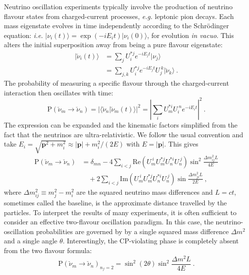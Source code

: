 Neutrino oscillation experiments typically involve the production of neutrino
flavour states from charged-current processes, \textit{e.g.} leptonic pion
decays. Each mass eigenstate evolves in time independently according to the
Schr\"{o}dinger equation: \textit{i.e.}
$| \nu_{i} (t) \rangle = \exp{(-i E_{i} t)} | \nu_{i} (0) \rangle$, for evolution
\textit{in vacuo}. This alters the initial superposition away from being a pure
flavour eigenstate:
\begin{align}
  | \breve{\nu}_{i} (t) \rangle &= \sum_{j} U_{i}^{* j} e^{-i E_{j} t} | \nu_{j} \rangle \\
                                &= \sum_{j,k} U_{i}^{* j} e^{-i E_{j} t} U_{j}^{\ k} | \breve{\nu}_{k} \rangle \ .
\end{align}
The probability of measuring a specific flavour through the charged-current
interaction then oscillates with time:
\begin{equation}
  \text{P}(\breve{\nu}_{m} \to \breve{\nu}_{n}) = | \langle \breve{\nu}_{n} | \breve{\nu}_{m} (t) \rangle |^{2} = \left| \sum_{i} U_{m}^{* i} U_{i}^{\ n} e^{-i E_{i} t} \right|^{2} \ .
\end{equation}
The expression can be expanded and the kinematic factors simplified from the
fact that the neutrinos are ultra-relativistic. We follow the usual convention
and take
$E_{i} = \sqrt{\mathbf{p}^{2} + m_{i}^{2}} \approx |\mathbf{p}| + m_{i}^{2} / (2 E)$
with $E = |\mathbf{p}|$. This gives
\begin{equation}
  \label{eq:neutrino-osc}
  \begin{aligned}
    \text{P}(\breve{\nu}_{m} \to \breve{\nu}_{n}) &= \delta_{mn} - 4 \sum_{i < j} \mathrm{Re}\left( U_{m}^{\ i} U_{m}^{* j} U_{n}^{* i} U_{n}^{\ j}  \right) \sin^{2} \frac{\Delta m_{ij}^{2} L}{4E}\\
    &\quad + 2 \sum_{i<j} \mathrm{Im}\left( U_{m}^{\ i} U_{m}^{* j} U_{n}^{* i} U_{n}^{\ j}  \right) \sin \frac{\Delta m^{2}_{ji} L}{2E} \ ,
  \end{aligned}
\end{equation}
where $\Delta m_{ij}^{2} \equiv m_{j}^{2} - m_{i}^{2}$ are the squared neutrino
mass differences and $L = ct$, sometimes called the baseline, is the approximate
distance travelled by the particles. To interpret the results of many
experiments, it is often sufficient to consider an effective two-flavour
oscillation paradigm. In this case, the neutrino-oscillation probabilities are
governed by by a single squared mass difference $\Delta m^{2}$ and a single
angle $\theta$. Interestingly, the CP-violating phase is completely absent from
the two flavour formula:
\begin{equation}
  \label{eq:two-flavour-osc}
  \text{P}(\breve{\nu}_{m} \to \breve{\nu}_{n})_{n_{f}=2} = \sin^{2} (2\theta) \sin^{2} \frac{\Delta m^{2} L}{4E} \ .
\end{equation}

